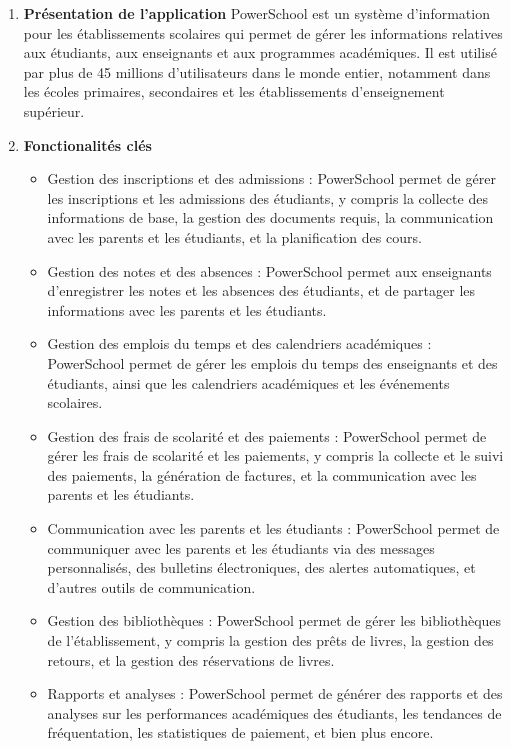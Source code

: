 \begin{enumerate}
    \item \textbf{Présentation de l'application} \newline PowerSchool est un système d'information pour les établissements scolaires qui permet de gérer les informations relatives aux étudiants, aux enseignants et aux programmes académiques. Il est utilisé par plus de 45 millions d'utilisateurs dans le monde entier, notamment dans les écoles primaires, secondaires et les établissements d'enseignement supérieur.
    \item \textbf{Fonctionalités clés} 
        \begin{itemize}
            \item Gestion des inscriptions et des admissions : PowerSchool permet de gérer les inscriptions et les admissions des étudiants, y compris la collecte des informations de base, la gestion des documents requis, la communication avec les parents et les étudiants, et la planification des cours.
            \item Gestion des notes et des absences : PowerSchool permet aux enseignants d'enregistrer les notes et les absences des étudiants, et de partager les informations avec les parents et les étudiants.
            \item Gestion des emplois du temps et des calendriers académiques : PowerSchool permet de gérer les emplois du temps des enseignants et des étudiants, ainsi que les calendriers académiques et les événements scolaires.
            \item Gestion des frais de scolarité et des paiements : PowerSchool permet de gérer les frais de scolarité et les paiements, y compris la collecte et le suivi des paiements, la génération de factures, et la communication avec les parents et les étudiants.
            \item Communication avec les parents et les étudiants : PowerSchool permet de communiquer avec les parents et les étudiants via des messages personnalisés, des bulletins électroniques, des alertes automatiques, et d'autres outils de communication.
            \item Gestion des bibliothèques : PowerSchool permet de gérer les bibliothèques de l'établissement, y compris la gestion des prêts de livres, la gestion des retours, et la gestion des réservations de livres.
            \item Rapports et analyses : PowerSchool permet de générer des rapports et des analyses sur les performances académiques des étudiants, les tendances de fréquentation, les statistiques de paiement, et bien plus encore.

\end{itemize}
\end{enumerate}
